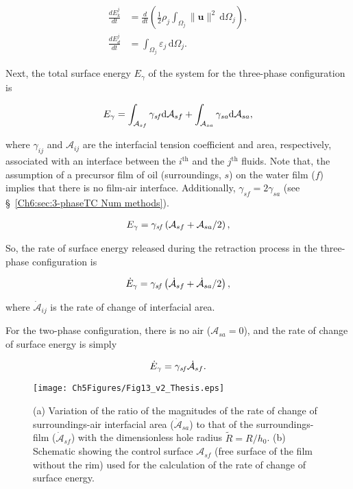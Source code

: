 \begin{subappendices}
	\begin{align}
		\label{Eqn::Ekt}
		\frac{dE_k^j}{dt} &= \frac{d}{dt}\left(\frac{1}{2}\rho_j\int_{\Omega_j}\|\boldsymbol{u}\|^2\,\mathrm{d}\Omega_j\right),\\
		\label{Eqn::Edt}
		\frac{dE_d^j}{dt} &= \int_{\Omega_j}\varepsilon_j\,\mathrm{d}\Omega_j.
	\end{align}
	
	Next, the total surface energy $E_\gamma$ of the system for the three-phase configuration is
	
	\begin{align}
		\label{Eqn::Es1}
		E_\gamma = \int_{\mathcal{A}_{sf}}\gamma_\mathit{sf}\mathrm{d}\mathcal{A}_{sf} + \int_{\mathcal{A}_{sa}}\gamma_\mathit{sa}\mathrm{d}\mathcal{A}_{sa},
	\end{align}
	
	\noindent where $\gamma_{ij}$ and $\mathcal{A}_{ij}$ are the interfacial tension coefficient and area, respectively, associated with an interface between the $i^{\text{th}}$ and the $j^{\text{th}}$ fluids. Note that, the assumption of a precursor film of oil (surroundings, $s$) on the water film ($f$) implies that there is no film-air interface. Additionally, $\gamma_{sf} = 2\gamma_{sa}$ (see \S~\ref{Ch6:sec:3-phaseTC Num methods}). 
	
	\begin{align}
		\label{Eqn::Es2}
		E_\gamma = \gamma_\mathit{sf}\left(\mathcal{A}_{sf} + \mathcal{A}_{sa}/2\right),
	\end{align}
	
	\noindent So, the rate of surface energy released during the retraction process in the three-phase configuration is
	
	\begin{align}
		\label{Eqn::Est1}
		\dot{E}_\gamma = \gamma_\mathit{sf}\left(\dot{\mathcal{A}}_{sf} + \dot{\mathcal{A}}_{sa}/2\right),
	\end{align}
	
	\noindent where $\dot{\mathcal{A}}_{ij}$ is the rate of change of interfacial area. 
	
	For the two-phase configuration, there is no air ($\mathcal{A}_{sa} = 0$), and the rate of change of surface energy is simply
	
	\begin{align}
		\label{Eqn::Est2}
		\dot{E}_\gamma = \gamma_\mathit{sf}\dot{\mathcal{A}}_{sf}.
	\end{align}
	
	\begin{figure}
		\centering
		\texttt{[image: Ch5Figures/Fig13\_v2\_Thesis.eps]}	
		\caption{(a) Variation of the ratio of the magnitudes of the rate of change of surroundings-air interfacial area ($\dot{\mathcal{A}}_{sa}$) to that of the surroundings-film ($\dot{\mathcal{A}}_{sf}$) with the dimensionless hole radius $\tilde{R} = R/h_0$. (b) Schematic showing the control surface $\mathcal{A}_{sf}$ (free surface of the film without the rim) used for the calculation of the rate of change of surface energy.}
		\label{fig:AreaRateRatio}
	\end{figure}
	

\end{subappendices}
